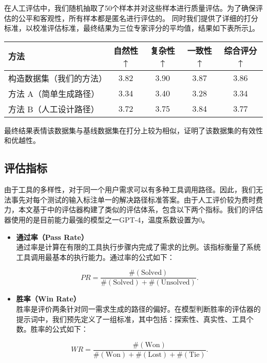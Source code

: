 在人工评估中，我们随机抽取了50个样本并对这些样本进行质量评估。为了确保评估的公平和客观性，所有样本都是匿名进行评估的。
同时我们提供了详细的打分标准，以校准评估标准，最终结果为三位专家评分的平均值，结果如下表所示\ref{tab:comparison}。

\begin{table}[h]
  \centering
  \label{tab:comparison}
  \begin{tabular}{l|c|c|c|c}
  \toprule
  \textbf{方法}               & \textbf{自然性↑} & \textbf{复杂性↑} & \textbf{一致性↑} & \textbf{综合评分↑} \\ \midrule
  构造数据集（我们的方法）   & 3.82             & 3.90             & 3.87             & 3.86              \\ \hline
  方法 A（简单生成路径）      & 3.34             & 3.40             & 3.28             & 3.34              \\ \hline
  方法 B（人工设计路径）      & 3.72             & 3.75             & 3.84             & 3.77              \\ 
  \bottomrule
  \end{tabular}
\end{table}

最终结果表情该数据集与基线数据集在打分上较为相似，证明了该数据集的有效性和优越性。

\subsection{评估指标}
由于工具的多样性，对于同一个用户需求可以有多种工具调用路径。因此，我们无法事先对每个测试的输入标注单一的解决路径标准答案。由于人工评价较为费时费力，本文基于\cite{Tang2023}中的评估器构建了类似的评估体系，包含以下两个指标。我们的评估器使用的是目前能力最强的模型之一GPT-4，温度系数设置为0。

\begin{itemize}
    \item \textbf{通过率（Pass Rate）} \\
    通过率是计算在有限的工具执行步骤内完成了需求的比例。该指标衡量了系统工具调用最基本的执行能力。通过率的公式如下：

    \begin{equation}
        PR = \frac{ \#(\text{Solved}) }{ \#(\text{Solved}) + \#(\text{Unsolved}) }.
    \end{equation}

    \item \textbf{胜率（Win Rate）} \\
    胜率是评价两条针对同一需求生成的路径的偏好。在模型判断胜率的评估器的提示词中，我们预先定义了一组标准，其中包括：探索性、真实性、工具个数。胜率的公式如下：

    \begin{equation}
        WR = \frac{ \#(\text{Won}) }{ \#(\text{Won}) + \#(\text{Lost}) + \#(\text{Tie}) }.
    \end{equation}

\end{itemize}

